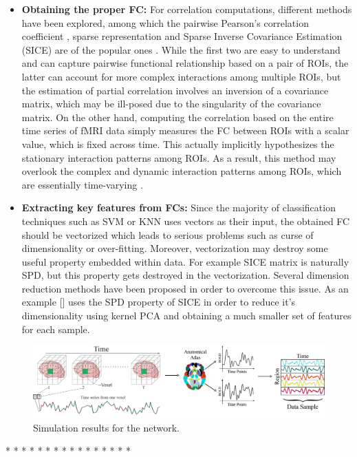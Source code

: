 \documentclass[journal]{IEEEtran}
\begin{document}
\begin{itemize}
	\item \textbf{Obtaining the proper FC:}
	For correlation computations, different methods have been explored, among which the pairwise Pearson’s correlation coefficient \cite{r10, r11}, sparse representation \cite{r10, r12, r13}  and Sparse Inverse Covariance Estimation (SICE) are of the popular ones \cite{r14, r15}. While the first two are easy to understand and can capture pairwise functional relationship based on a pair of ROIs, the latter can account for more complex interactions among multiple ROIs, but the estimation of partial correlation involves an inversion of a covariance matrix, which may be ill-posed due to the singularity of the covariance matrix. On the other hand, computing the correlation based on the entire time series of fMRI data simply measures the FC between ROIs with a scalar value, which is fixed across time. This actually implicitly hypothesizes the stationary interaction patterns among ROIs. As a result, this method may overlook the complex and dynamic interaction patterns among ROIs, which are essentially time-varying \cite{r16}\textendash \cite{r19}.
	
	\item \textbf{Extracting key features from FCs:}
	Since the majority of classification techniques such as SVM or KNN uses vectors as their input, the obtained FC should be vectorized which leads to serious problems such as curse of dimensionality or over-fitting. Moreover, vectorization may destroy some useful property embedded within data. For example SICE matrix is naturally SPD, but this property gets destroyed in the vectorization. Several dimension reduction methods have been proposed in order to overcome this issue. As an example [] uses the SPD property of SICE in order to reduce it's dimensionality using kernel PCA and obtaining a much smaller set of features for each sample. 
\end{itemize}

	
	\begin{figure}[!t]
		\centering
		\includegraphics[width=6in]{Data}
		
		\caption{Simulation results for the network.}
		\label{g1.1}
	\end{figure}
{\color{red}  * * * * * * * * * * * * * * * *}
\end{document}
